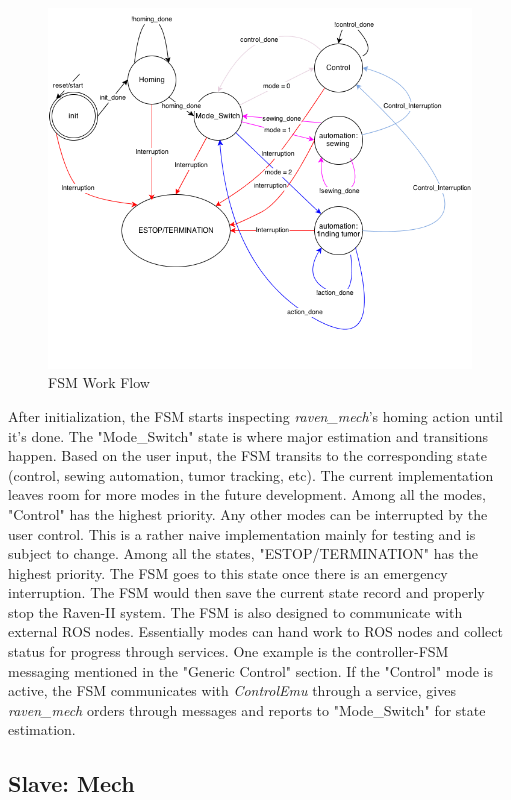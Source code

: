 \documentclass[letterpaper,twocolumn,10pt]{article}
\begin{document}
\begin{figure}[h]
\includegraphics[scale=0.4]{FSM.png}
\caption{FSM Work Flow}
\end{figure}

After initialization, the FSM starts inspecting {\it raven\_mech}'s
homing action until it's done. The "Mode\_Switch" state is where major
estimation and transitions happen. Based on the user input, the FSM
transits to the corresponding state (control, sewing automation, tumor
tracking, etc). The current implementation leaves room for more modes
in the future development. Among all the modes, "Control" has the
highest priority. Any other modes can be interrupted by the user
control. This is a rather naive implementation mainly for testing and
is subject to change. Among all the states, "ESTOP/TERMINATION" has
the highest priority. The FSM goes to this state once there is an
emergency interruption. The FSM would then save the current state
record and properly stop the Raven-II system. The FSM is also designed
to communicate with external ROS nodes. Essentially modes can hand
work to ROS nodes and collect status for progress through
services. One example is the controller-FSM messaging mentioned in the
"Generic Control" section. If the "Control" mode is active, the FSM
communicates with {\it ControlEmu} through a service, gives {\it
  raven\_mech} orders through messages and reports to "Mode\_Switch"
for state estimation.

\subsection{Slave: Mech} %
\end{document}
